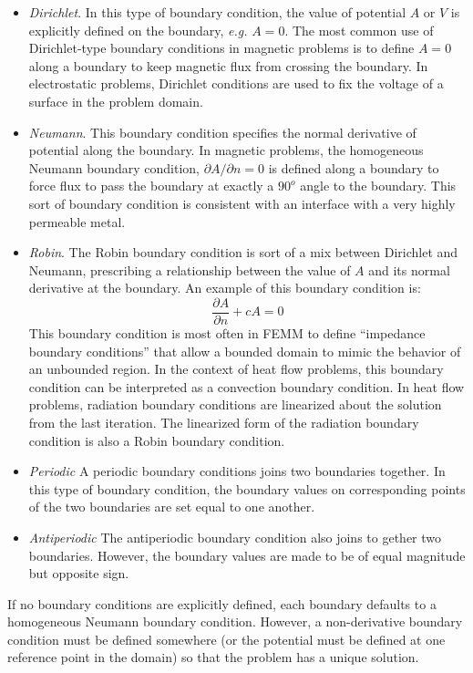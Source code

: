 \documentclass[12pt]{report}
\begin{document}
\begin{itemize}
\item {\em Dirichlet}. In this type of boundary condition, the
value of potential $A$ or $V$ is explicitly defined on the
boundary, {\em e.g.} $A=0$.  The most common use of Dirichlet-type
boundary conditions in magnetic problems is to define $A=0$ along a
boundary to keep magnetic flux from crossing the boundary.  In
electrostatic problems, Dirichlet conditions are used to fix the
voltage of a surface in the problem domain.
\item {\em Neumann}. This boundary condition specifies the normal
derivative of potential along the boundary.  In magnetic problems,
the homogeneous Neumann boundary condition, $\partial A/\partial n
= 0$ is defined along a boundary to force flux to pass the boundary
at exactly a $90^o$ angle to the boundary. This sort of boundary
condition is consistent with an interface with a very highly
permeable metal.
\item {\em Robin}. The Robin boundary condition is sort of a mix
between Dirichlet and Neumann, prescribing a relationship between
the value of $A$ and its normal derivative at the boundary.  An
example of this boundary condition is:
\begin{displaymath}
\frac{\partial A}{\partial n} + c A = 0
\end{displaymath}
This boundary condition is most often in FEMM to define ``impedance
boundary conditions'' that allow a bounded domain to mimic the
behavior of an unbounded region.  In the context of heat flow problems,
this boundary condition can be interpreted as a convection boundary condition.
In heat flow problems, radiation boundary conditions are linearized about 
the solution from the last iteration. The linearized form of the radiation
boundary condition is also a Robin boundary condition.
\item {\em Periodic}
A periodic boundary conditions joins two boundaries together.  In this
type of boundary condition, the boundary values on 
corresponding points of the two boundaries are set equal to one another.
\item {\em Antiperiodic}
The antiperiodic boundary condition also joins to gether two boundaries.
However, the boundary values are made to be of equal magnitude but
opposite sign.
\end{itemize}

If no boundary conditions are explicitly defined, each boundary
defaults to a homogeneous Neumann boundary condition. However, a
non-derivative boundary condition must be defined somewhere (or the
potential must be defined at one reference point in the domain) so
that the problem has a unique solution.
\end{document}
